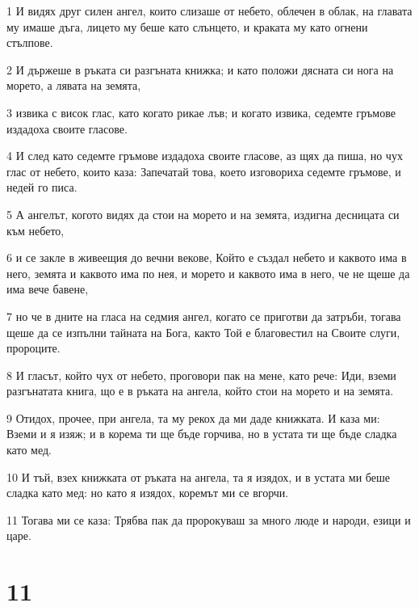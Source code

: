 \par 1 И видях друг силен ангел, които слизаше от небето, облечен в облак, на главата му имаше дъга, лицето му беше като слънцето, и краката му като огнени стълпове.
\par 2 И държеше в ръката си разгъната книжка; и като положи дясната си нога на морето, а лявата на земята,
\par 3 извика с висок глас, като когато рикае лъв; и когато извика, седемте гръмове издадоха своите гласове.
\par 4 И след като седемте гръмове издадоха своите гласове, аз щях да пиша, но чух глас от небето, които каза: Запечатай това, което изговориха седемте гръмове, и недей го писа.
\par 5 А ангелът, когото видях да стои на морето и на земята, издигна десницата си към небето,
\par 6 и се закле в живеещия до вечни векове, Който е създал небето и каквото има в него, земята и каквото има по нея, и морето и каквото има в него, че не щеше да има вече бавене,
\par 7 но че в дните на гласа на седмия ангел, когато се приготви да затръби, тогава щеше да се изпълни тайната на Бога, както Той е благовестил на Своите слуги, пророците.
\par 8 И гласът, който чух от небето, проговори пак на мене, като рече: Иди, вземи разгънатата книга, що е в ръката на ангела, който стои на морето и на земята.
\par 9 Отидох, прочее, при ангела, та му рекох да ми даде книжката. И каза ми: Вземи и я изяж; и в корема ти ще бъде горчива, но в устата ти ще бъде сладка като мед.
\par 10 И тъй, взех книжката от ръката на ангела, та я изядох, и в устата ми беше сладка като мед: но като я изядох, коремът ми се вгорчи.
\par 11 Тогава ми се каза: Трябва пак да пророкуваш за много люде и народи, езици и царе.

\chapter{11}

